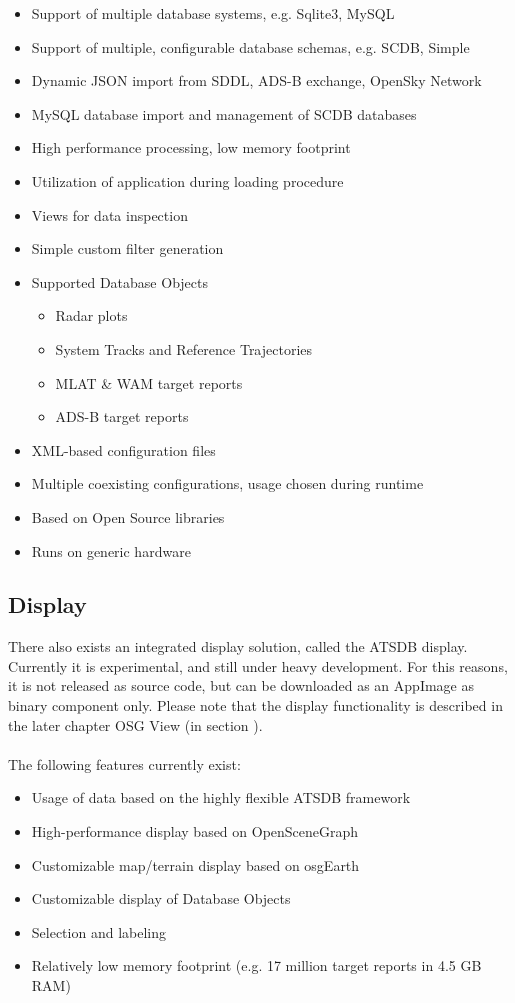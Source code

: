 \begin{itemize}  
\item Support of multiple database systems, e.g. Sqlite3, MySQL
\item Support of multiple, configurable database schemas, e.g. SCDB, Simple
\item Dynamic JSON import from SDDL, ADS-B exchange, OpenSky Network
\item MySQL database import and management of SCDB databases
\item High performance processing, low memory footprint
\item Utilization of application during loading procedure
\item Views for data inspection
\item Simple custom filter generation
\item Supported Database Objects
\begin{itemize}  
\item Radar plots
\item System Tracks and Reference Trajectories
\item MLAT \& WAM target reports
\item ADS-B target reports
\end{itemize}
\item XML-based configuration files
\item Multiple coexisting configurations, usage chosen during runtime
\item Based on Open Source libraries
\item Runs on generic hardware
\end{itemize}

\subsection{Display}
There also exists an integrated display solution, called the ATSDB display. Currently it is experimental, and still under heavy development. For this reasons, it is not released as source code, but can be downloaded as an AppImage as binary component only. Please note that the display functionality is described in the later chapter OSG View (in section ).\\\\

The following features currently exist:

\begin{itemize}  
\item Usage of data based on the highly flexible ATSDB framework
\item High-performance display based on OpenSceneGraph
\item Customizable map/terrain display based on osgEarth
\item Customizable display of Database Objects
\item Selection and labeling
\item Relatively low memory footprint (e.g. 17 million target reports in 4.5 GB RAM)
\end{itemize}

